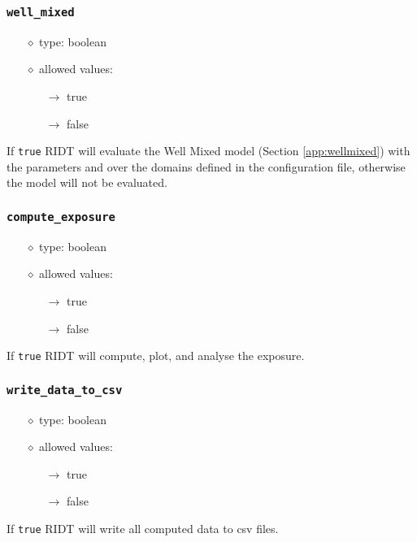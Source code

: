 \documentclass[]{article}
\def\code#1{\texttt{#1}}
\begin{document}
\subsubsection{\code{well\_mixed}}
\begin{itemize}
    \item[$\diamond$] type: boolean
    \item[$\diamond$] allowed values:
    \begin{itemize}
        \item[$\rightarrow$] true
        \item[$\rightarrow$] false
    \end{itemize}
\end{itemize}
If \code{true} RIDT will evaluate the Well Mixed model (Section
\ref{app:wellmixed}) with the parameters and over the domains defined in the
configuration file, otherwise the model will not be evaluated.

\subsubsection{\code{compute\_exposure}}
\begin{itemize}
    \item[$\diamond$] type: boolean
    \item[$\diamond$] allowed values:
    \begin{itemize}
        \item[$\rightarrow$] true
        \item[$\rightarrow$] false
    \end{itemize}
\end{itemize}
If \code{true} RIDT will compute, plot, and analyse the exposure.

\subsubsection{\code{write\_data\_to\_csv}}
\begin{itemize}
    \item[$\diamond$] type: boolean
    \item[$\diamond$] allowed values:
    \begin{itemize}
        \item[$\rightarrow$] true
        \item[$\rightarrow$] false
    \end{itemize}
\end{itemize}
If \code{true} RIDT will write all computed data to csv files.
\end{document}
